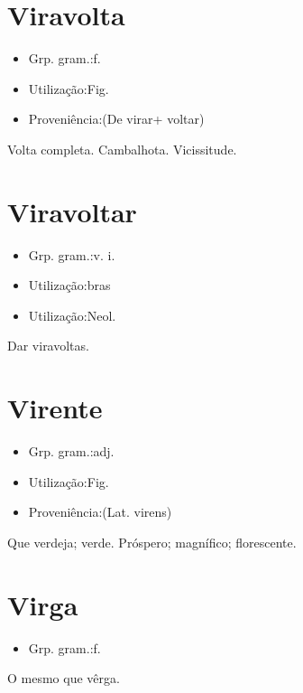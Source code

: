 \documentclass{article}
\begin{document}
\section{Viravolta}
\begin{itemize}
\item {Grp. gram.:f.}
\end{itemize}
\begin{itemize}
\item {Utilização:Fig.}
\end{itemize}
\begin{itemize}
\item {Proveniência:(De \textunderscore virar\textunderscore  + \textunderscore voltar\textunderscore )}
\end{itemize}
Volta completa.
Cambalhota.
Vicissitude.
\section{Viravoltar}
\begin{itemize}
\item {Grp. gram.:v. i.}
\end{itemize}
\begin{itemize}
\item {Utilização:bras}
\end{itemize}
\begin{itemize}
\item {Utilização:Neol.}
\end{itemize}
Dar viravoltas.
\section{Virente}
\begin{itemize}
\item {Grp. gram.:adj.}
\end{itemize}
\begin{itemize}
\item {Utilização:Fig.}
\end{itemize}
\begin{itemize}
\item {Proveniência:(Lat. \textunderscore virens\textunderscore )}
\end{itemize}
Que verdeja; verde.
Próspero; magnífico; florescente.
\section{Virga}
\begin{itemize}
\item {Grp. gram.:f.}
\end{itemize}
O mesmo que \textunderscore vêrga\textunderscore .
\end{document}
